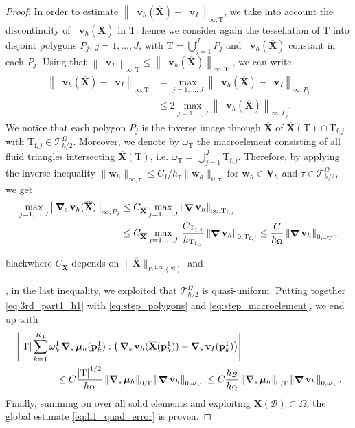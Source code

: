 \documentclass[oneside]{amsart} %
\newcommand{\norm}[1]{\left\lVert#1\right\rVert}
\newcommand{\abs}[1]{\left\lvert#1\right\rvert}
\DeclareMathOperator*{\Grad}{\boldsymbol\nabla}
\DeclareMathOperator{\grads}{\boldsymbol\nabla_s}
\newcommand\B{\mathcal B} %
\renewcommand\v{\mathbf{v}} %
\newcommand\w{\mathbf{w}} %
\newcommand\X{\mathbf{X}} %
\newcommand\Xbar{\overline{\X}} %
\newcommand\Vline{\mathbf{V}} %
\newcommand\mmu{{\boldsymbol\mu}} %
\newcommand\T{\mathcal{T}} %
\newcommand\quadnode{\mathbf{p}}
\newcommand\quadweigth{\omega}
\newcommand\tri{\mathrm{T}} %
\newcommand\trifj{\tri_{\mathrm{f},j}} %
\newcommand\DB{\begin{color}{black}}
\newcommand\BD{\end{color}}
\begin{document}
\begin{proof}
		In order to estimate $\norm{\grads\v_h(\Xbar)-\grads\v_I}_{\infty,\tri}$,
		we take into account the discontinuity of $\grads\v_h(\Xbar)$ in $\tri$:
		hence we consider again the tessellation of $\tri$ into disjoint polygons
		$P_j$, $j=1,\dots,J$, with $\tri=\bigcup_{j=1}^J P_j$
		and $\grads\v_h(\Xbar)$ constant in each $P_j$.
		Using that $\norm{\grads\v_I}_{\infty,\tri} \le\norm{\grads\v_h(\Xbar)}_{\infty,\tri} $ ,
		we can write
		\begin{equation}\label{eq:step_polygons}
			\begin{aligned}
				\norm{\grads\v_h(\Xbar)-\grads\v_I}_{\infty,\tri} 
				&= \max_{j=1,\dots,J} \norm{\grads\v_h(\Xbar)-\grads\v_I}_{\infty,P_j}\\
				&\le 2 \max_{j=1,\dots,J} \norm{\grads\v_h(\Xbar)}_{\infty,P_j}.
			\end{aligned}
		\end{equation}
		We notice that each polygon $P_j$ is the inverse image
		through $\Xbar$ of $\Xbar(\tri)\cap\trifj$ with $\trifj\in\T_{h/2}^\Omega$.
		Moreover, we denote by $\omega_\tri$ the macroelement
		consisting of all fluid triangles intersecting $\Xbar(\tri)$,
		i.e. ${\omega_\tri = \bigcup_{j=1}^J \trifj}$.
		Therefore, by applying the inverse inequality
		$\|\w_h\|_{\infty,\tau}\le C_I/h_\tau\|\w_h\|_{0,\tau}$ for $\w_h\in\Vline_h$
		and $\tau\in\T_{h/2}^\Omega$, we get
		\begin{equation}\label{eq:step_macroelement}
			\begin{aligned}
				\max_{j=1,\dots,J} \norm{\grads\v_h(\Xbar)}_{\infty,P_j}
				&\le \DB C_{\Xbar}\BD\max_{j=1,\dots,J} \norm{\Grad\v_h}_{\infty,\trifj}\\
				&\le \DB C_{\Xbar}\BD\max_{j=1,\dots,J}\,\frac{\DB C_{\trifj}\BD}{h_{\trifj}}
				\norm{\Grad\v_h}_{0,\trifj}
				\le \frac{\DB C\BD}{h_{\Omega}} \norm{\Grad\v_h}_{0,\omega_\tri},
			\end{aligned}
		\end{equation}
		\DB where $C_{\Xbar}$ depends on $\|\Xbar\|_{W^{1,\infty}(\B)}$ and\BD, in the last
		inequality, we exploited that $\T_{h/2}^\Omega$ is quasi-uniform. Putting
		together \eqref{eq:3rd_part1_h1} with \eqref{eq:step_polygons} and
		\eqref{eq:step_macroelement}, we end up with
		\begin{equation}
			\begin{aligned}
				&\abs{\abs{\tri} \sum_{k=1}^{K_1}\quadweigth_k^1 \grads\mmu_h(\quadnode_k^1): \big(\grads\v_h(\Xbar(\quadnode_k^1))-\grads\v_I(\quadnode_k^1)\big)}\\
				& \hspace{1.5cm} \le C \frac{\abs{\tri}^{1/2}}{h_{\Omega}} \norm{\grads\mmu_h}_{0,\tri} \norm{\Grad\v_h}_{0,\omega_\tri}\
				\le C\frac{h_\B}{h_{\Omega}} \norm{\grads\mmu_h}_{0,\tri} \norm{\Grad\v_h}_{0,\omega_\tri}.
			\end{aligned}
		\end{equation}
		Finally, summing on over all solid elements and exploiting $\Xbar(\B)\subset\Omega$, the global estimate \eqref{eq:h1_quad_error} is proven.
		
	\end{proof}
	
\end{document}
